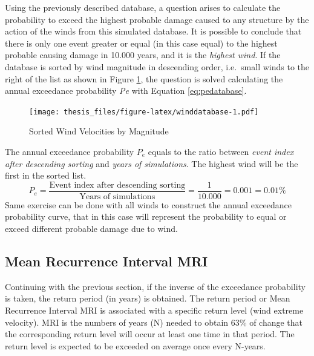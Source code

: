 \documentclass[12pt,oneside]{reedthesis}
\begin{document}
Using the previously described database, a question arises to calculate the probability to exceed the highest probable damage caused to any structure by the action of the winds from this simulated database. It is possible to conclude that there is only one event greater or equal (in this case equal) to the highest probable causing damage in 10.000 years, and it is the \emph{highest wind}. If the database is sorted by wind magnitude in descending order, i.e.~small winds to the right of the list as shown in Figure \ref{fig:winddatabase}, the question is solved calculating the annual exceedance probability \emph{Pe} with Equation \eqref{eq:pedatabase}.

\footnotesize
\begin{figure}
\centering
\texttt{[image: thesis\_files/figure-latex/winddatabase-1.pdf]}
\caption{\label{fig:winddatabase}Sorted Wind Velocities by Magnitude}
\end{figure}
\normalsize

The annual exceedance probability \(P_e\) equals to the ratio between \emph{event index after descending sorting} and \emph{years of simulations}. The highest wind will be the first in the sorted list.
\begin{equation}
        P_e = \frac{\textrm{Event index after descending sorting}}{\textrm{Years of simulations}}= \frac{1}{10.000}=0.001=0.01\%
  \label{eq:pedatabase}
\end{equation}
Same exercise can be done with all winds to construct the annual exceedance probability curve, that in this case will represent the probability to equal or exceed different probable damage due to wind.

\hypertarget{mean-recurrence-interval-mri}{%
\subsection{Mean Recurrence Interval MRI}\label{mean-recurrence-interval-mri}}

Continuing with the previous section, if the inverse of the exceedance probability is taken, the return period (in years) is obtained. The return period or Mean Recurrence Interval MRI is associated with a specific return level (wind extreme velocity). MRI is the numbers of years (N) needed to obtain 63\% of change that the corresponding return level will occur at least one time in that period. The return level is expected to be exceeded on average once every N-years.
\end{document}
